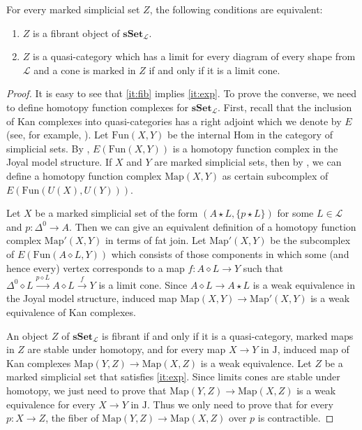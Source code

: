 \documentclass[reqno]{amsart}
\theoremstyle{definition}
\theoremstyle{remark}
\newcommand{\cat}[1]{\mathbf{#1}}
\newcommand{\sSet}{\cat{sSet}}
\newcommand{\join}{\star}
\newcommand{\fjoin}{\diamond}
\newcommand{\Map}{\mathrm{Map}}
\newcommand{\Fun}{\mathrm{Fun}}
\newcommand{\J}{\mathrm{J}}
\numberwithin{figure}{section}
\begin{document}
\begin{prop}
For every marked simplicial set $Z$, the following conditions are equivalent:
\begin{enumerate}
\item \label{it:fib} $Z$ is a fibrant object of $\sSet_\mathcal{L}$.
\item \label{it:exp} $Z$ is a quasi-category which has a limit for every diagram of every shape from $\mathcal{L}$ and a cone is marked in $Z$ if and only if it is a limit cone.
\end{enumerate}
\end{prop}
\begin{proof}
It is easy to see that \eqref{it:fib} implies \eqref{it:exp}.
To prove the converse, we need to define homotopy function complexes for $\sSet_\mathcal{L}$.
First, recall that the inclusion of Kan complexes into quasi-categories has a right adjoint which we denote by $E$ (see, for example, \cite[Proposition~1.2.5.3]{lurie-topos}).
Let $\Fun(X,Y)$ be the internal Hom in the category of simplicial sets.
By \cite[Corollary~3.1.4.4]{lurie-topos}, $E(\Fun(X,Y))$ is a homotopy function complex in the Joyal model structure.
If $X$ and $Y$ are marked simplicial sets, then by , we can define a homotopy function complex $\Map(X,Y)$ as certain subcomplex of $E(\Fun(U(X),U(Y)))$.

Let $X$ be a marked simplicial set of the form $(A \join L, \{ p \join L \})$ for some $L \in \mathcal{L}$ and $p : \Delta^0 \to A$.
Then we can give an equivalent definition of a homotopy function complex $\Map'(X,Y)$ in terms of fat join.
Let $\Map'(X,Y)$ be the subcomplex of $E(\Fun(A \fjoin L, Y))$ which consists of those components in which some (and hence every) vertex
corresponds to a map $f : A \fjoin L \to Y$ such that $\Delta^0 \fjoin L \xrightarrow{p \fjoin L} A \fjoin L \xrightarrow{f} Y$ is a limit cone.
Since $A \fjoin L \to A \join L$ is a weak equivalence in the Joyal model structure, induced map $\Map(X,Y) \to \Map'(X,Y)$ is a weak equivalence of Kan complexes.

An object $Z$ of $\sSet_\mathcal{L}$ is fibrant if and only if it is a quasi-category, marked maps in $Z$ are stable under homotopy,
and for every map $X \to Y$ in $\J$, induced map of Kan complexes $\Map(Y,Z) \to \Map(X,Z)$ is a weak equivalence.
Let $Z$ be a marked simplicial set that satisfies \eqref{it:exp}.
Since limits cones are stable under homotopy, we just need to prove that $\Map(Y,Z) \to \Map(X,Z)$ is a weak equivalence for every $X \to Y$ in $\J$.
Thus we only need to prove that for every $p : X \to Z$, the fiber of $\Map(Y,Z) \to \Map(X,Z)$ over $p$ is contractible.


\end{proof}
\end{document}
